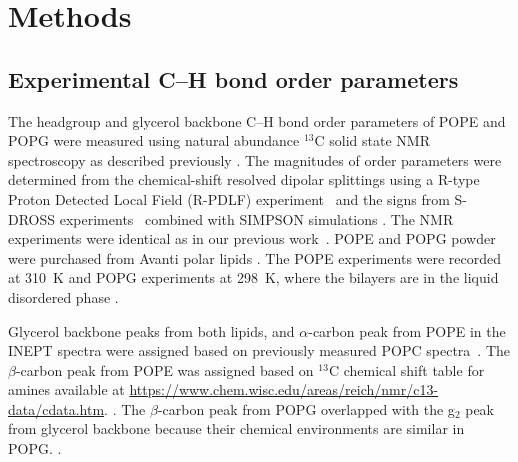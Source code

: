 \documentclass[aps,prl,superscriptaddress,twocolumn]{revtex4}
\begin{document}
\section{Methods}
\subsection{Experimental C--H bond order parameters}
The headgroup and glycerol backbone C--H bond order parameters of POPE and POPG
were measured using natural abundance $^{13}$C solid state NMR spectroscopy
as described previously \cite{ferreira13,ferreira16}.
The magnitudes of order parameters were determined from the chemical-shift resolved dipolar splittings
using a R-type Proton Detected Local Field (R-PDLF) experiment~\cite{dvinskikh04} and
the signs from S-DROSS experiments~\cite{gross97} combined with SIMPSON simulations \cite{bak00}.
The NMR experiments were identical as in our previous work~\cite{antila19}.
POPE and POPG powder were purchased from Avanti polar lipids .
The POPE experiments were recorded at 310~K and POPG experiments at 298~K, where the bilayers are in the liquid disordered phase \cite{marsh13}.


Glycerol backbone peaks from both lipids, and $\alpha$-carbon peak from POPE in the INEPT spectra 
were assigned based on previously measured POPC spectra~\cite{ferreira13}.
The $\beta$-carbon peak from POPE was assigned based on $^{13}$C chemical shift table for amines available
at \url{https://www.chem.wisc.edu/areas/reich/nmr/c13-data/cdata.htm}.
.
The $\beta$-carbon peak from POPG overlapped with the g$_2$ peak from glycerol backbone
because their chemical environments are similar in POPG.
.
\end{document}
